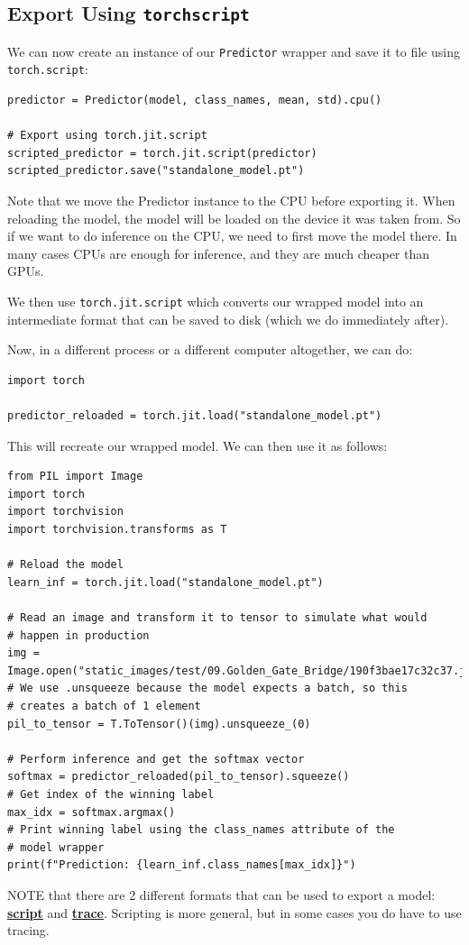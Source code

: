 \subsection{Export Using \lstinline{torchscript}}

We can now create an instance of our \lstinline{Predictor} wrapper and save it to file using \lstinline{torch.script}:
\begin{lstlisting}
predictor = Predictor(model, class_names, mean, std).cpu()

# Export using torch.jit.script
scripted_predictor = torch.jit.script(predictor)
scripted_predictor.save("standalone_model.pt")
\end{lstlisting}
Note that we move the Predictor instance to the CPU before exporting it. When reloading the model, the model will be loaded on the device it was taken from. So if we want to do inference on the CPU, we need to first move the model there. In many cases CPUs are enough for inference, and they are much cheaper than GPUs. \newline

We then use \lstinline{torch.jit.script} which converts our wrapped model into an intermediate format that can be saved to disk (which we do immediately after).\newline

Now, in a different process or a different computer altogether, we can do:
\begin{lstlisting}
import torch

predictor_reloaded = torch.jit.load("standalone_model.pt")
\end{lstlisting}
This will recreate our wrapped model. We can then use it as follows:
\begin{lstlisting}
from PIL import Image
import torch
import torchvision
import torchvision.transforms as T

# Reload the model
learn_inf = torch.jit.load("standalone_model.pt")

# Read an image and transform it to tensor to simulate what would
# happen in production
img = Image.open("static_images/test/09.Golden_Gate_Bridge/190f3bae17c32c37.jpg")
# We use .unsqueeze because the model expects a batch, so this
# creates a batch of 1 element
pil_to_tensor = T.ToTensor()(img).unsqueeze_(0)

# Perform inference and get the softmax vector
softmax = predictor_reloaded(pil_to_tensor).squeeze()
# Get index of the winning label
max_idx = softmax.argmax()
# Print winning label using the class_names attribute of the 
# model wrapper
print(f"Prediction: {learn_inf.class_names[max_idx]}")
\end{lstlisting}
NOTE that there are 2 different formats that can be used to export a model: \href{https://pytorch.org/docs/stable/generated/torch.jit.script.html\#torch.jit.script}{\textbf{script}} and \href{https://pytorch.org/docs/stable/generated/torch.jit.trace.html\#torch.jit.trace}{\textbf{trace}}. Scripting is more general, but in some cases you do have to use tracing.

